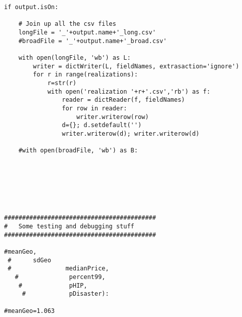 \begin{lstlisting}
if output.isOn:
        
    # Join up all the csv files
    longFile = '_'+output.name+'_long.csv'
    #broadFile = '_'+output.name+'_broad.csv'

    with open(longFile, 'wb') as L:
        writer = dictWriter(L, fieldNames, extrasaction='ignore')
        for r in range(realizations):
            r=str(r)
            with open('realization '+r+'.csv','rb') as f:
                reader = dictReader(f, fieldNames)
                for row in reader:
                    writer.writerow(row)
                d={}; d.setdefault('')
                writer.writerow(d); writer.writerow(d)
                
    #with open(broadFile, 'wb') as B:
        
                    
        
    



##########################################
#   Some testing and debugging stuff
##########################################

#meanGeo,
 #      sdGeo
 #               medianPrice,
   #              percent99,
    #             pHIP,
     #            pDisaster):
        
#meanGeo=1.063




\end{lstlisting}
